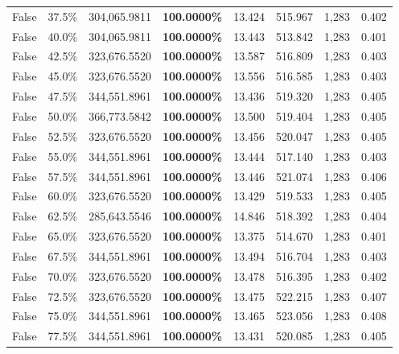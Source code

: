 \begin{table}[H]
\begin{tabular}{lllrllll}
False & 37.5\% & 304,065.9811 & \bfseries \color{red} 100.0000\% & 13.424 & 515.967 & 1,283 & 0.402 \\
\cline{1-8}
False & 40.0\% & 304,065.9811 & \bfseries \color{red} 100.0000\% & 13.443 & 513.842 & 1,283 & 0.401 \\
\cline{1-8}
False & 42.5\% & 323,676.5520 & \bfseries \color{red} 100.0000\% & 13.587 & 516.809 & 1,283 & 0.403 \\
\cline{1-8}
False & 45.0\% & 323,676.5520 & \bfseries \color{red} 100.0000\% & 13.556 & 516.585 & 1,283 & 0.403 \\
\cline{1-8}
False & 47.5\% & 344,551.8961 & \bfseries \color{red} 100.0000\% & 13.436 & 519.320 & 1,283 & 0.405 \\
\cline{1-8}
False & 50.0\% & 366,773.5842 & \bfseries \color{red} 100.0000\% & 13.500 & 519.404 & 1,283 & 0.405 \\
\cline{1-8}
False & 52.5\% & 323,676.5520 & \bfseries \color{red} 100.0000\% & 13.456 & 520.047 & 1,283 & 0.405 \\
\cline{1-8}
False & 55.0\% & 344,551.8961 & \bfseries \color{red} 100.0000\% & 13.444 & 517.140 & 1,283 & 0.403 \\
\cline{1-8}
False & 57.5\% & 344,551.8961 & \bfseries \color{red} 100.0000\% & 13.446 & 521.074 & 1,283 & 0.406 \\
\cline{1-8}
False & 60.0\% & 323,676.5520 & \bfseries \color{red} 100.0000\% & 13.429 & 519.533 & 1,283 & 0.405 \\
\cline{1-8}
False & 62.5\% & \color{red} 285,643.5546 & \bfseries \color{red} 100.0000\% & 14.846 & 518.392 & 1,283 & 0.404 \\
\cline{1-8}
False & 65.0\% & 323,676.5520 & \bfseries \color{red} 100.0000\% & 13.375 & 514.670 & 1,283 & 0.401 \\
\cline{1-8}
False & 67.5\% & 344,551.8961 & \bfseries \color{red} 100.0000\% & 13.494 & 516.704 & 1,283 & 0.403 \\
\cline{1-8}
False & 70.0\% & 323,676.5520 & \bfseries \color{red} 100.0000\% & 13.478 & 516.395 & 1,283 & 0.402 \\
\cline{1-8}
False & 72.5\% & 323,676.5520 & \bfseries \color{red} 100.0000\% & 13.475 & 522.215 & 1,283 & 0.407 \\
\cline{1-8}
False & 75.0\% & 344,551.8961 & \bfseries \color{red} 100.0000\% & 13.465 & 523.056 & 1,283 & 0.408 \\
\cline{1-8}
False & 77.5\% & 344,551.8961 & \bfseries \color{red} 100.0000\% & 13.431 & 520.085 & 1,283 & 0.405 \\

\end{tabular}
\end{table}
